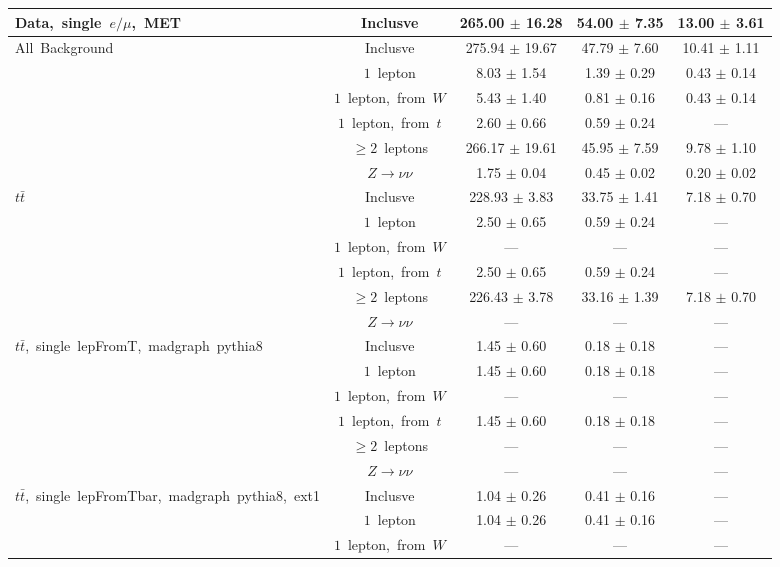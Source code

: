\documentclass{article}
\begin{document}
\begin{longtable}{|l|c|c|c|c|}
\multirow{1}{*}{Data,~single~$e/\mu$,~MET} & Inclusve  & 265.00 $\pm$ 16.28  & 54.00 $\pm$ 7.35  & 13.00 $\pm$ 3.61 \\* 
\hline \hline 
\multirow{6}{*}{All~Background} & Inclusve  & 275.94 $\pm$ 19.67  & 47.79 $\pm$ 7.60  & 10.41 $\pm$ 1.11 \\* 
 & $1$~lepton  & 8.03 $\pm$ 1.54  & 1.39 $\pm$ 0.29  & 0.43 $\pm$ 0.14 \\* 
 & $1$~lepton,~from~$W$  & 5.43 $\pm$ 1.40  & 0.81 $\pm$ 0.16  & 0.43 $\pm$ 0.14 \\* 
 & $1$~lepton,~from~$t$  & 2.60 $\pm$ 0.66  & 0.59 $\pm$ 0.24  & --- \\* 
 & $\ge2$~leptons  & 266.17 $\pm$ 19.61  & 45.95 $\pm$ 7.59  & 9.78 $\pm$ 1.10 \\* 
 & $Z\rightarrow\nu\nu$  & 1.75 $\pm$ 0.04  & 0.45 $\pm$ 0.02  & 0.20 $\pm$ 0.02 \\* 
\hline 
\multirow{6}{*}{$t\bar{t}$} & Inclusve  & 228.93 $\pm$ 3.83  & 33.75 $\pm$ 1.41  & 7.18 $\pm$ 0.70 \\* 
 & $1$~lepton  & 2.50 $\pm$ 0.65  & 0.59 $\pm$ 0.24  & --- \\* 
 & $1$~lepton,~from~$W$  & ---  & ---  & --- \\* 
 & $1$~lepton,~from~$t$  & 2.50 $\pm$ 0.65  & 0.59 $\pm$ 0.24  & --- \\* 
 & $\ge2$~leptons  & 226.43 $\pm$ 3.78  & 33.16 $\pm$ 1.39  & 7.18 $\pm$ 0.70 \\* 
 & $Z\rightarrow\nu\nu$  & ---  & ---  & --- \\* 
\hline 
\multirow{6}{*}{$t\bar{t}$,~single~lepFromT,~madgraph~pythia8} & Inclusve  & 1.45 $\pm$ 0.60  & 0.18 $\pm$ 0.18  & --- \\* 
 & $1$~lepton  & 1.45 $\pm$ 0.60  & 0.18 $\pm$ 0.18  & --- \\* 
 & $1$~lepton,~from~$W$  & ---  & ---  & --- \\* 
 & $1$~lepton,~from~$t$  & 1.45 $\pm$ 0.60  & 0.18 $\pm$ 0.18  & --- \\* 
 & $\ge2$~leptons  & ---  & ---  & --- \\* 
 & $Z\rightarrow\nu\nu$  & ---  & ---  & --- \\* 
\hline 
\multirow{6}{*}{$t\bar{t}$,~single~lepFromTbar,~madgraph~pythia8,~ext1} & Inclusve  & 1.04 $\pm$ 0.26  & 0.41 $\pm$ 0.16  & --- \\* 
 & $1$~lepton  & 1.04 $\pm$ 0.26  & 0.41 $\pm$ 0.16  & --- \\* 
 & $1$~lepton,~from~$W$  & ---  & ---  & --- \\* 

\end{longtable}
\end{document}
